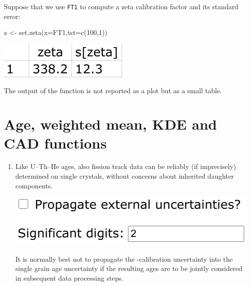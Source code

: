 \begin{refsection}
Suppose that we use \texttt{FT1} to compute a zeta calibration factor
and its standard error:

\begin{console}
z <- set.zeta(x=FT1,tst=c(100,1))
\end{console}

\noindent\begin{minipage}[t]{.2\linewidth}
\strut\vspace*{-\baselineskip}\newline
\includegraphics[width=\linewidth]{../figures/zetaoutput.png}
\end{minipage}
\begin{minipage}[t]{.8\linewidth}
The output of the function is not reported as a plot but as a small table.
\end{minipage}

\section{Age, weighted mean, KDE and CAD functions}

\begin{enumerate}

\item Like U--Th--He ages, also fission track data can be reliably (if
  imprecisely) determined on single crystals, without concerns about
  inherited daughter components.\\

\noindent\begin{minipage}[t]{.4\linewidth}
\strut\vspace*{-\baselineskip}\newline
\includegraphics[width=\linewidth]{../figures/FTageSettings.png}
\end{minipage}
\begin{minipage}[t]{.6\linewidth}
It is normally best not to propagate the \textzeta-calibration
uncertainty into the single grain age uncertainty if the resulting
ages are to be jointly considered in subsequent data processing steps.
\end{minipage}


\end{enumerate}
\end{refsection}
